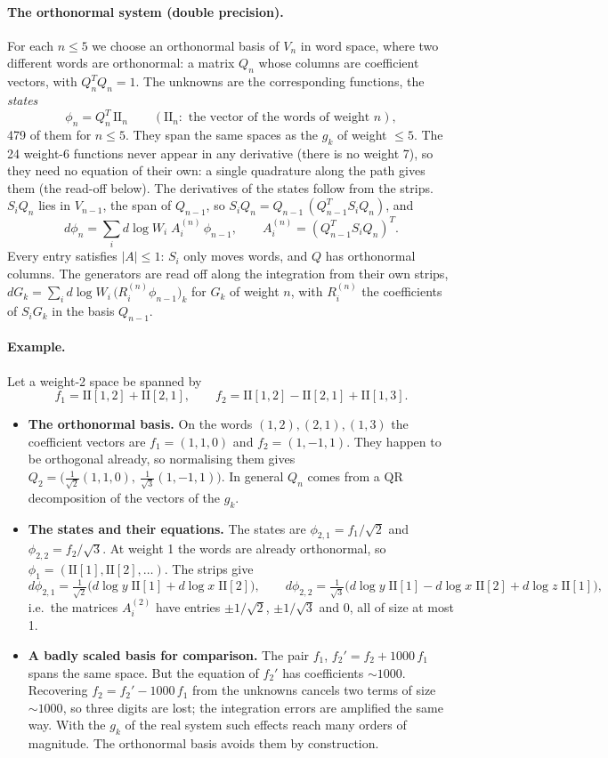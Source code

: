 \documentclass[11pt]{article}
\newcommand{\II}{\mathrm{II}}
\begin{document}
\paragraph{The orthonormal system (double precision).} For each $n\le5$ we choose an orthonormal basis of $V_n$ in word
space, where two different words are orthonormal: a matrix $Q_n$ whose columns are coefficient vectors, with
$Q_n^TQ_n=1$. The unknowns are the corresponding
functions, the \emph{states}
\[
  \phi_n=Q_n^T\,\II_n\qquad(\II_n:\text{ the vector of the words of weight }n),
\]
479 of them for $n\le5$. They span the same spaces as the $g_k$ of weight $\le5$. The 24 weight-6 functions never
appear in any derivative (there is no weight 7), so they need no equation of their own: a single quadrature along the
path gives them (the read-off below). The derivatives of the states follow from the strips. $S_iQ_n$ lies in
$V_{n-1}$, the span of $Q_{n-1}$, so $S_iQ_n=Q_{n-1}\,(Q_{n-1}^TS_iQ_n)$, and
\[
  d\phi_n=\sum_id\log W_i\;A_i^{(n)}\,\phi_{n-1},\qquad A_i^{(n)}=(Q_{n-1}^TS_iQ_n)^T .
\]
Every entry satisfies $|A|\le1$: $S_i$ only moves words, and $Q$ has orthonormal columns. The generators are read off
along the integration from their own strips, $dG_k=\sum_id\log W_i\,\big(R_i^{(n)}\phi_{n-1}\big)_k$ for $G_k$ of weight
$n$, with $R_i^{(n)}$ the coefficients of $S_iG_k$ in the basis $Q_{n-1}$.

\paragraph{Example.} Let a weight-2 space be spanned by
\[
  f_1=\II[1,2]+\II[2,1],\qquad f_2=\II[1,2]-\II[2,1]+\II[1,3].
\]
\begin{itemize}
\item \textbf{The orthonormal basis.} On the words $(1,2),(2,1),(1,3)$ the coefficient vectors are $f_1=(1,1,0)$ and
  $f_2=(1,-1,1)$. They happen to be orthogonal already, so normalising them gives
  $Q_2=\big(\tfrac1{\sqrt2}(1,1,0),\ \tfrac1{\sqrt3}(1,-1,1)\big)$. In general $Q_n$ comes from a QR decomposition of the
  vectors of the $g_k$.
\item \textbf{The states and their equations.} The states are $\phi_{2,1}=f_1/\sqrt2$ and $\phi_{2,2}=f_2/\sqrt3$. At
  weight 1 the words are already orthonormal, so $\phi_1=(\II[1],\II[2],\dots)$. The strips give
  \[
    d\phi_{2,1}=\tfrac1{\sqrt2}\big(d\log y\;\II[1]+d\log x\;\II[2]\big),\qquad
    d\phi_{2,2}=\tfrac1{\sqrt3}\big(d\log y\;\II[1]-d\log x\;\II[2]+d\log z\;\II[1]\big),
  \]
  i.e.\ the matrices $A_i^{(2)}$ have entries $\pm1/\sqrt2$, $\pm1/\sqrt3$ and 0, all of size at most 1.
\item \textbf{A badly scaled basis for comparison.} The pair $f_1$, $f_2'=f_2+1000\,f_1$ spans the same space. But the
  equation of $f_2'$ has coefficients $\sim1000$. Recovering $f_2=f_2'-1000\,f_1$ from the unknowns cancels two terms
  of size $\sim1000$, so three digits are lost; the integration errors are amplified the same way. With the $g_k$ of the real system such effects reach many orders of
  magnitude. The orthonormal basis avoids them by construction.
\end{itemize}
\end{document}

